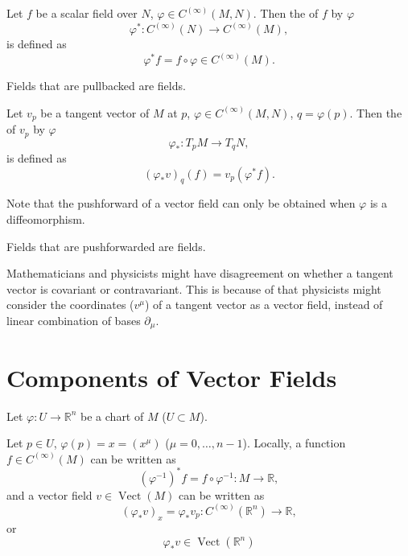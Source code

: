 \documentclass[openany, oneside, a5paper]{book}
\DeclareMathOperator{\Vect}{Vect}
\begin{document}
\begin{definition}[pullback]
    Let $f$ be a scalar field over $N$, $\varphi \in C^{(\infty)}(M, N)$. Then the  of $f$ by $\varphi$ 
    \begin{equation}
        \varphi^* \colon C^{(\infty)}(N) \to C^{(\infty)}(M),
    \end{equation}
    is defined as
    \begin{equation}
        \varphi^* f = f \circ \varphi \in C^{(\infty)}(M).
    \end{equation}
\end{definition}

Fields that are pullbacked are  fields.

\begin{definition}[pushforward]
    Let $v_p$ be a tangent vector of $M$ at $p$, $\varphi \in C^{(\infty)}(M, N)$, $q = \varphi(p)$. 
    Then the  of $v_p$ by $\varphi$ 
    \begin{equation}
        \varphi_* \colon T_p M \to T_q N,
    \end{equation}
    is defined as
    \begin{equation}
        (\varphi_* v)_q(f) = v_p(\varphi^* f).
    \end{equation}
\end{definition}

Note that the pushforward of a vector field can only be obtained when $\varphi$ is a diffeomorphism.

Fields that are pushforwarded are  fields.

Mathematicians and physicists might have disagreement on whether a tangent vector is covariant or contravariant.
This is because of that physicists might consider the coordinates ($v^\mu$) of a tangent vector as a vector field, instead of linear combination of bases $\partial_\mu$.

\section{Components of Vector Fields}

Let $\varphi \colon U \to \mathbb R^n$ be a chart of $M$ ($U \subset M$).

Let $p \in U$, $\varphi(p) = x = (x^\mu)$ ($\mu = 0, \ldots, n-1$).
Locally, a function $f \in C^{(\infty)}(M)$ can be written as
\begin{equation}
    (\varphi^{-1})^* f = f \circ \varphi^{-1} \colon M \to \mathbb R,
\end{equation}
and a vector field $v \in \Vect(M)$ can be written as
\begin{equation}
    (\varphi_* v)_{x} = \varphi_* v_p \colon C^{(\infty)}(\mathbb R^n) \to \mathbb R,
\end{equation}
or
\begin{equation}
    \varphi_* v  \in \Vect(\mathbb R^n)
\end{equation}
\end{document}
